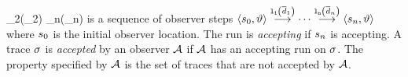 \location_2(\dbar_2)
\cdots
\location_n(\dbar_n)
\)
is a sequence of observer steps 
\(
\left\langle s_0,\vartheta\right\rangle
\stackrel{{\tt l_1}\left(\overline{d}_1\right)}{\longrightarrow}
\cdots
\stackrel{{\tt l_n}\left(\overline{d}_n\right)}{\longrightarrow}
\left\langle s_n,\vartheta\right\rangle
\) where $s_0$ is the initial observer location.
The run is \emph{accepting} if $s_n$ is accepting.
A trace $\sigma$ is \emph{accepted} by an observer ${\cal A}$ if ${\cal A}$ has an accepting run
on $\sigma$.
The property specified by ${\cal A}$ is the set of traces that are 
not accepted by ${\cal A}$.







